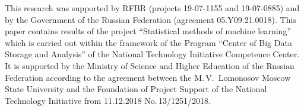 


\vspace*{-22pt}

\Ack

\vspace*{-4pt}
\noindent
 This research was supported by RFBR (projects 19-07-1155 and 19-07-0885) and by  the Government of the 
Russian Federation (agreement 05.Y09.21.0018). This paper contains results of the project ``Statistical 
methods of machine learning'' which is carried out within the framework of the Program ``Center of Big 
Data Storage and Analysis'' of the National Technology Initiative Competence Center. It is supported by 
the Ministry of Science and Higher Education of the Russian Federation according to the agreement 
between the M.\,V.~Lomonosov Moscow State University and the Foundation of Project Support of the 
National Technology Initiative from 11.12.2018 No.\,13/1251/2018.


